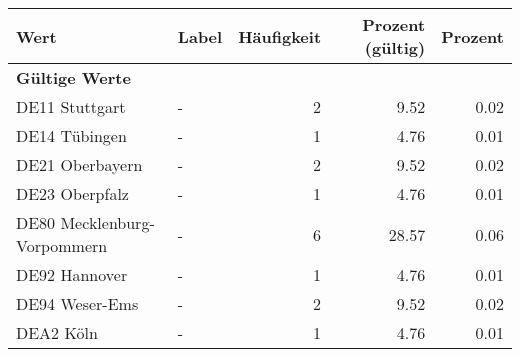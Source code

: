      \begin{longtable}{Xlrrr}
     \toprule
     \textbf{Wert} & \textbf{Label} & \textbf{Häufigkeit} & \textbf{Prozent (gültig)} & \textbf{Prozent} \\
     \endhead
     \midrule
     \multicolumn{5}{l}{\textbf{Gültige Werte}}\\

     \multicolumn{1}{X}{DE11 Stuttgart} &
     - &
     \num{2} &
     \num[round-mode=places,round-precision=2]{9.52} &
     \num[round-mode=places,round-precision=2]{0.02} \\

     \multicolumn{1}{X}{DE14 Tübingen} &
     - &
     \num{1} &
     \num[round-mode=places,round-precision=2]{4.76} &
     \num[round-mode=places,round-precision=2]{0.01} \\

     \multicolumn{1}{X}{DE21 Oberbayern} &
     - &
     \num{2} &
     \num[round-mode=places,round-precision=2]{9.52} &
     \num[round-mode=places,round-precision=2]{0.02} \\

     \multicolumn{1}{X}{DE23 Oberpfalz} &
     - &
     \num{1} &
     \num[round-mode=places,round-precision=2]{4.76} &
     \num[round-mode=places,round-precision=2]{0.01} \\

     \multicolumn{1}{X}{DE80 Mecklenburg-Vorpommern} &
     - &
     \num{6} &
     \num[round-mode=places,round-precision=2]{28.57} &
     \num[round-mode=places,round-precision=2]{0.06} \\

     \multicolumn{1}{X}{DE92 Hannover} &
     - &
     \num{1} &
     \num[round-mode=places,round-precision=2]{4.76} &
     \num[round-mode=places,round-precision=2]{0.01} \\

     \multicolumn{1}{X}{DE94 Weser-Ems} &
     - &
     \num{2} &
     \num[round-mode=places,round-precision=2]{9.52} &
     \num[round-mode=places,round-precision=2]{0.02} \\

     \multicolumn{1}{X}{DEA2 Köln} &
     - &
     \num{1} &
     \num[round-mode=places,round-precision=2]{4.76} &
     \num[round-mode=places,round-precision=2]{0.01} \\


\end{longtable}
